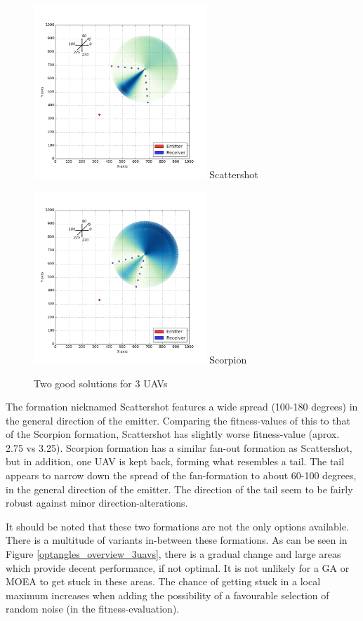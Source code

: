 \documentclass[10pt,a4paper]{book}
\begin{document}
\begin{figure}[H]
\centering
\begin{minipage}{60mm}
  \centering
  \includegraphics[width=65mm]{optangles/3uavs5steps100deg_2.png}
  Scattershot
\end{minipage}%
\begin{minipage}{60mm}
  \centering
  \includegraphics[width=65mm]{optangles/3uavs5steps60deg_2.png}
  Scorpion
\end{minipage}
\caption{Two good solutions for 3 \glspl{UAV}}
\label{optangles_scat_scorp}
\end{figure}

The formation nicknamed Scattershot features a wide spread (100-180 degrees) in the general direction of the emitter. Comparing the fitness-values of this to that of the Scorpion formation, Scattershot has slightly worse fitness-value (aprox. 2.75 vs 3.25). Scorpion formation has a similar fan-out formation as Scattershot, but in addition, one \gls{UAV} is kept back, forming what resembles a tail. The tail appears to narrow down the spread of the fan-formation to about 60-100 degrees, in the general direction of the emitter. The direction of the tail seem to be fairly robust against minor direction-alterations.

It should be noted that these two formations are not the only options available. There is a multitude of variants in-between these formations. As can be seen in Figure \ref{optangles_overview_3uavs}, there is a gradual change and large areas which provide decent performance, if not optimal. It is not unlikely for a \gls{GA} or \gls{MOEA} to get stuck in these areas. The chance of getting stuck in a local maximum increases when adding the possibility of a favourable selection of random noise (in the fitness-evaluation).
\end{document}
